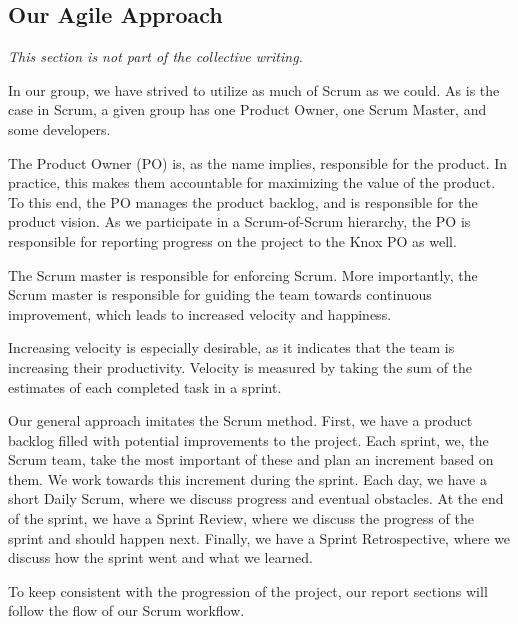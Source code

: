 \subsection{Our Agile Approach}\label{our_agile_approach}
\textit{This section is not part of the collective writing.}

In our group, we have strived to utilize as much of Scrum as we could.
As is the case in Scrum, a given group has one Product Owner, one Scrum Master, and some developers\cite{sutherlandScrumArtDoing2014}.

The Product Owner (PO) is, as the name implies, responsible for the product. In practice, this makes them accountable for maximizing the value of the product. To this end, the PO manages the product backlog, and is responsible for the product vision. As we participate in a Scrum-of-Scrum hierarchy, the PO is responsible for reporting progress on the project to the Knox PO as well.

The Scrum master is responsible for enforcing Scrum. More importantly, the Scrum master is responsible for guiding the team towards continuous improvement, which leads to increased velocity and happiness\cite{sutherlandScrumArtDoing2014}.

Increasing velocity is especially desirable, as it indicates that the team is increasing their productivity. Velocity is measured by taking the sum of the estimates of each completed task in a sprint.\cite{sutherlandScrumArtDoing2014} 

Our general approach imitates the Scrum method. First, we have a product backlog filled with potential improvements to the project. Each sprint, we, the Scrum team, take the most important of these and plan an increment based on them. We work towards this increment during the sprint. Each day, we have a short Daily Scrum, where we discuss progress and eventual obstacles. At the end of the sprint, we have a Sprint Review, where we discuss the progress of the sprint and should happen next. Finally, we have a Sprint Retrospective, where we discuss how the sprint went and what we learned.

To keep consistent with the progression of the project, our report sections will follow the flow of our Scrum workflow.